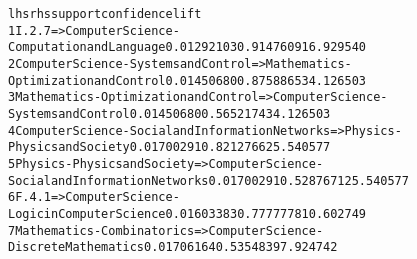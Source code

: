 \begin{alltt}\tiny

  lhs                                                     rhs                                                     support confidence      lift
1 {I.2.7}                                              => {Computer Science - Computation and Language}        0.01292103  0.9147609 16.929540
2 {Computer Science - Systems and Control}             => {Mathematics - Optimization and Control}             0.01450680  0.8758865 34.126503
3 {Mathematics - Optimization and Control}             => {Computer Science - Systems and Control}             0.01450680  0.5652174 34.126503
4 {Computer Science - Social and Information Networks} => {Physics - Physics and Society}                      0.01700291  0.8212766 25.540577
5 {Physics - Physics and Society}                      => {Computer Science - Social and Information Networks} 0.01700291  0.5287671 25.540577
6 {F.4.1}                                              => {Computer Science - Logic in Computer Science}       0.01603383  0.7777778 10.602749
7 {Mathematics - Combinatorics}                        => {Computer Science - Discrete Mathematics}            0.01706164  0.5354839  7.924742
\end{alltt}
